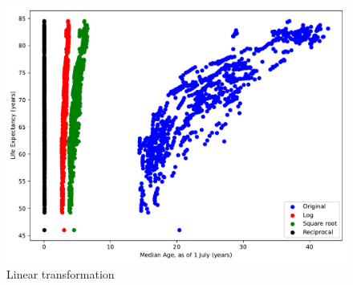 \documentclass[a4paper]{article}
\begin{document}
\begin{figure}[h]
  \begin{center}
    \includegraphics[width=\textwidth]{ola/linear_transformation.pdf}
    \caption{Linear transformation}
    \label{fig:linear_transformation}
  \end{center}
\end{figure}
\end{document}
